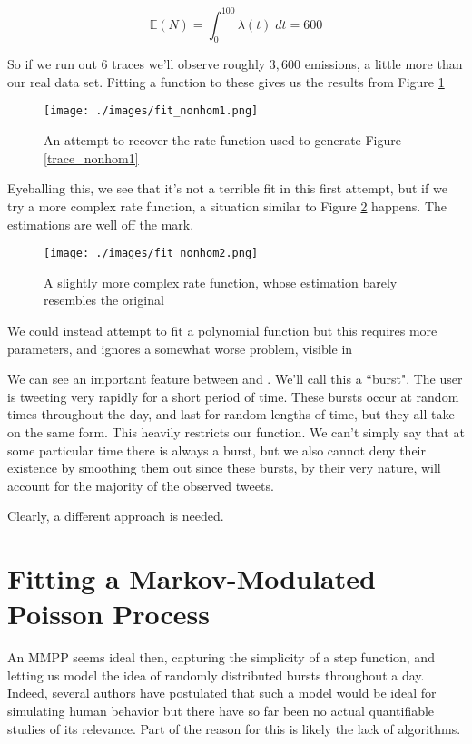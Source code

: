 $$
\mathbb{E}(N) = \int^{100}_0 \lambda(t) \; dt = 600
$$

So if we run out 6 traces we'll observe roughly $3,600$ emissions, a little more than our real data set. Fitting a function to these gives us the results from Figure \ref{fit_nonhom1}

\begin{figure}[h]
\texttt{[image: ./images/fit\_nonhom1.png]}
\caption{An attempt to recover the rate function used to generate Figure \ref{trace_nonhom1}}
\label{fit_nonhom1}
\end{figure}

Eyeballing this, we see that it's not a terrible fit in this first attempt, but if we try a more complex rate function, a situation similar to Figure \ref{fit_nonhom2} happens. The estimations are well off the mark.

\begin{figure}[h]
\texttt{[image: ./images/fit\_nonhom2.png]}
\caption{A slightly more complex rate function, whose estimation barely resembles the original}
\label{fit_nonhom2}
\end{figure}

We could instead attempt to fit a polynomial function but this requires more parameters, and ignores a somewhat worse problem, visible in %


We can see an important feature between 
and
. We'll call this a ``burst". The user is tweeting very rapidly for a short period of time. These bursts occur at random times throughout the day, and last for random lengths of time, but they all take on the same form. This heavily restricts our function. We can't simply say that at some particular time there is always a burst, but we also cannot deny their existence by smoothing them out since these bursts, by their very nature, will account for the majority of the observed tweets.

Clearly, a different approach is needed.

\section{Fitting a Markov-Modulated Poisson Process}

An MMPP seems ideal then, capturing the simplicity of a step function, and letting us model the idea of randomly distributed bursts throughout a day. Indeed, several authors have postulated that such a model would be ideal for simulating human behavior %
but there have so far been no actual quantifiable studies of its relevance. Part of the reason for this is likely the lack of algorithms.

